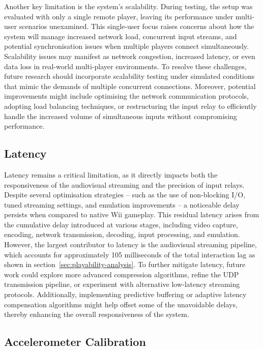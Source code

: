 Another key limitation is the system’s scalability. During testing, the setup
was evaluated with only a single remote player, leaving its performance under
multi-user scenarios unexamined. This single-user focus raises concerns about
how the system will manage increased network load, concurrent input streams, and
potential synchronisation issues when multiple players connect simultaneously.
Scalability issues may manifest as network congestion, increased latency, or
even data loss in real-world multi-player environments. To resolve these
challenges, future research should incorporate scalability testing under
simulated conditions that mimic the demands of multiple concurrent connections.
Moreover, potential improvements might include optimising the network
communication protocols, adopting load balancing techniques, or restructuring
the input relay to efficiently handle the increased volume of simultaneous
inputs without compromising performance.

\subsection{Latency}

Latency remains a critical limitation, as it directly impacts both the
responsiveness of the audiovisual streaming and the precision of input relays.
Despite several optimisation strategies -- such as the use of non-blocking I/O,
tuned streaming settings, and emulation improvements -- a noticeable delay
persists when compared to native Wii gameplay. This residual latency arises from
the cumulative delay introduced at various stages, including video capture,
encoding, network transmission, decoding, input processing, and emulation.
However, the largest contributor to latency is the audiovisual streaming
pipeline, which accounts for approximately 105 milliseconds of the total
interaction lag as shown in section~\ref{sec:playability-analysis}. To further
mitigate latency, future work could explore more advanced compression
algorithms, refine the UDP transmission pipeline, or experiment with alternative
low-latency streaming protocols. Additionally, implementing predictive buffering
or adaptive latency compensation algorithms might help offset some of the
unavoidable delays, thereby enhancing the overall responsiveness of the system.

\subsection{Accelerometer Calibration}

